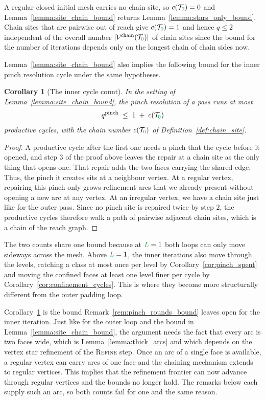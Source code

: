 \documentclass[a4paper, 12pt]{article}
\newcommand{\green}{\color{ForestGreen}}
\newcommand{\T}{\mathcal{T}}
\newcommand{\V}{\mathcal{V}}
\renewcommand{\L}{{\green L}}
\newcommand{\lzero}{{\green 0}}
\newtheorem{corollary}[theorem]{Corollary}
\theoremstyle{definition}
\theoremstyle{plain}
\numberwithin{equation}{section}
\begin{document}
A regular closed initial mesh carries no chain site, so $c(\T_\lzero) = 0$ and Lemma~\ref{lemma:site_chain_bound} returns Lemma~\ref{lemma:stars_only_bound}. Chain sites that are pairwise out of reach give $c(\T_\lzero) = 1$ and hence $q \leq 2$ independent of the overall number $\vert \V^{\mathrm{chain}}(\T_\lzero) \vert$ of chain sites since the bound for the number of iterations depends only on the longest chain of chain sides now.

Lemma~\ref{lemma:site_chain_bound} also implies the following bound for the inner pinch resolution cycle under the same hypotheses.

\begin{corollary}[The inner cycle count]
    \label{cor:pinch_cycles_chain}
    In the setting of Lemma~\ref{lemma:site_chain_bound}, the pinch resolution of a pass runs at most
    \begin{equation}
        \label{eq:pinch_cycles_chain}
        q^{\mathrm{pinch}} \; \leq \; 1 \; + \; c(\T_\lzero)
    \end{equation}
    productive cycles, with the chain number $c(\T_\lzero)$ of Definition~\ref{def:chain_site}.
\end{corollary}
\begin{proof}
    A productive cycle after the first one needs a pinch that the cycle before it opened, and step $3$ of the proof above leaves the repair at a chain site as the only thing that opens one. That repair adds the two faces carrying the shared edge. Thus, the pinch it creates sits at a neighbour vertex. At a regular vertex, repairing this pinch only grows refinement arcs that we already present without opening a new arc at any vertex. At an irregular vertex, we have a chain site just like for the outer pass. Since no pinch site is repaired twice by step $2$, the productive cycles therefore walk a path of pairwise adjacent chain sites, which is a chain of the reach graph.
\end{proof}

The two counts share one bound because at $\L = 1$ both loops can only move sideways across the mesh. Above $\L=1$, the inner iterations also move through the levels, catching a class at most once per level by Corollary~\ref{cor:pinch_spent} and moving the confined faces at least one level finer per cycle by Corollary~\ref{cor:confinement_cycles}. This is where they become more structurally different from the outer padding loop.

Corollary~\ref{cor:pinch_cycles_chain} is the bound Remark~\ref{rem:pinch_rounds_bound} leaves open for the inner iteration. Just like for the outer loop and the bound in Lemma~\ref{lemma:site_chain_bound}, the argument needs the fact that every arc is two faces wide, which is Lemma~\ref{lemma:thick_arcs} and which depends on the vertex star refinement of the \textsc{Refine} step. Once an arc of a single face is available, a regular vertex can carry arcs of one face and the chaining mechanism extends to regular vertices. This implies that the refinement frontier can now advance through regular vertices and the bounds no longer hold. The remarks below each supply such an arc, so both counts fail for one and the same reason.
\end{document}
